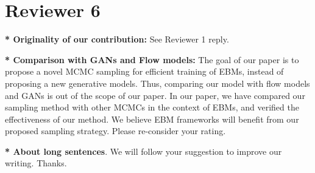 \documentclass[letterpaper]{article} %
\begin{document}
\vspace{-0.1in}
\section{Reviewer 6}


\noindent \textbf{* Originality of our contribution:} 
See Reviewer 1 reply.



\noindent \textbf{* Comparison with GANs and Flow models:} The goal of our paper is to propose a novel MCMC sampling for efficient training of EBMs, instead of proposing a new generative models. Thus, comparing our model with flow models and GANs is out of the scope of our paper. In our paper, we have compared our sampling method with other MCMCs in the context of EBMs, and verified the effectiveness of our method. We believe EBM frameworks will benefit from our proposed sampling strategy. Please re-consider your rating. 

\noindent \textbf{* About long sentences}. We will follow your suggestion to improve our writing. Thanks. 
\end{document}
